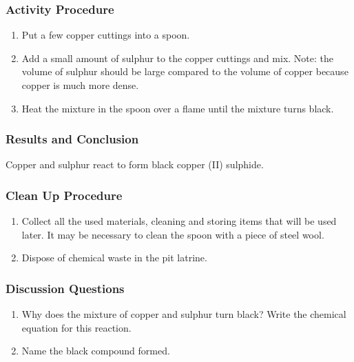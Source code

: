 \subsubsection*{Activity Procedure}
\begin{enumerate}
\item{Put a few copper cuttings into a spoon.}
\item{Add a small amount of sulphur to the copper cuttings and mix. Note: the volume of sulphur should be large compared to the volume of copper because copper is much more dense.}
\item{Heat the mixture in the spoon over a flame until the mixture turns black.}
\end{enumerate}

\subsubsection*{Results and Conclusion}
Copper and sulphur react to form black copper (II) sulphide.

\subsubsection*{Clean Up Procedure}
\begin{enumerate}
\item{Collect all the used materials, cleaning and storing items that will be used later. It may be necessary to clean the spoon with a piece of steel wool.}
\item{Dispose of chemical waste in the pit latrine.}
\end{enumerate}

\subsubsection*{Discussion Questions}
\begin{enumerate}
\item{Why does the mixture of copper and sulphur turn black? Write the chemical equation for this reaction.}
\item{Name the black compound formed.}
\end{enumerate}
